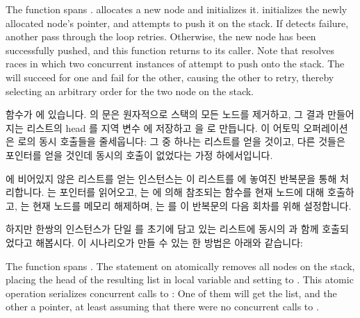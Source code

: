 \begin{fcvref}
\begin{fcvref}
The  function spans .
 allocates a new node and
 initializes it.
 initializes the newly allocated node's 
pointer, and  attempts to push it on the stack.
If  detects  failure, another pass
through the loop retries.
Otherwise, the new node has been successfully pushed, and this function
returns to its caller.
Note that  resolves races in which two concurrent
instances of  attempt to push onto the stack.
The  will succeed for one and fail for the other,
causing the other to retry, thereby selecting an arbitrary order for
the two node on the stack.

\fi

 함수가  에 있습니다.
 의  문은 원자적으로 스택의 모든 노드를
제거하고, 그 결과 만들어지는 리스트의 head 를 지역 변수  에 저장하고
 을  로 만듭니다.
이 어토믹 오퍼레이션은  로의 동시 호출들을 줄세웁니다:
그 중 하나는 리스트를 얻을 것이고, 다른 것들은  포인터를 얻을 것인데
동시의  호출이 없었다는 가정 하에서입니다.

 에 비어있지 않은 리스트를 얻는  인스턴스는 이
리스트를  에 놓여진 반복문을 통해
처리합니다.
 는  포인터를 읽어오고,  는
 에 의해 참조되는 함수를 현재 노드에 대해 호출하고,
 는 현재 노드를 메모리 해제하며,  는
 를 이 반복문의 다음 회차를 위해 설정합니다.

하지만 한쌍의  인스턴스가 단일  를 초기에 담고 있는
리스트에 동시의  과 함께 호출되었다고 해봅시다.
이 시나리오가 만들 수 있는 한 방법은 아래와 같습니다:

\iffalse

The  function spans .
The  statement on  atomically removes
all nodes on the stack, placing the head of the resulting list in local
variable  and setting  to .
This atomic operation serializes concurrent calls to :
One of them will get the list, and the other a  pointer, at
least assuming that there were no concurrent calls to .


\end{fcvref}
\end{fcvref}
